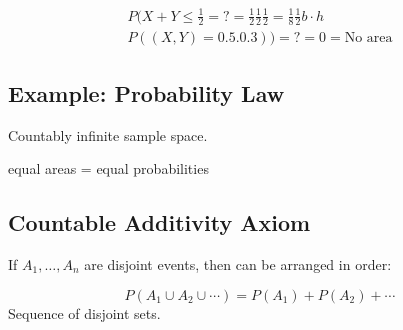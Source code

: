 \begin{align*}
P(X+Y \le \frac{1}{2}=? = \frac{1}{2} \frac{1}{2}\frac{1}{2} = \frac{1}{8}\frac{1}{2}b\cdot h\\
P((X,Y) = 0.5.0.3))= ? = 0 = \text{No area}
\end{align*}





\subsection{Example: Probability Law}

Countably infinite sample space.

equal areas = equal probabilities

\subsection{Countable Additivity Axiom}

If $A_1,\ldots, A_n$ are disjoint events, then can be arranged in order:

$$
P(A_1 \cup A_2 \cup \cdots) = P(A_1) + P(A_2) + \cdots
$$
Sequence of disjoint sets.
